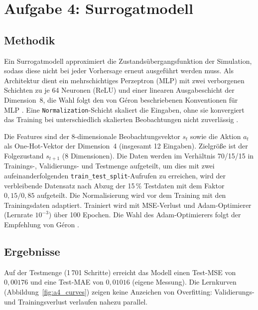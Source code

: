 
\section{Aufgabe 4: Surrogatmodell}
\label{sec:aufgabe4}

\subsection{Methodik}

Ein Surrogatmodell approximiert die Zustandsübergangsfunktion der Simulation, sodass diese nicht bei jeder Vorhersage erneut ausgeführt werden muss. Als Architektur dient ein mehrschichtiges Perzeptron (\ac{MLP}) mit zwei verborgenen Schichten zu je 64 Neuronen (\ac{ReLU}) und einer linearen Ausgabeschicht der Dimension~8, die Wahl folgt den von Géron beschriebenen Konventionen für \ac{MLP} \cite[S.~443--446]{1}. Eine \texttt{Normalization}-Schicht skaliert die Eingaben, ohne sie konvergiert das Training bei unterschiedlich skalierten Beobachtungen nicht zuverlässig \cite[S.~51--53]{2}.

Die Features sind der 8-dimensionale Beobachtungsvektor $s_t$ sowie die Aktion $a_t$ als One-Hot-Vektor der Dimension~4 (insgesamt 12 Eingaben). Zielgröße ist der Folgezustand $s_{t+1}$ (8 Dimensionen). Die Daten werden im Verhältnis 70/15/15 in Trainings-, Validierungs- und Testmenge aufgeteilt, um dies mit zwei aufeinanderfolgenden \texttt{train\_test\_split}-Aufrufen zu erreichen, wird der verbleibende Datensatz nach Abzug der 15\,\% Testdaten mit dem Faktor $0{,}15/0{,}85$ aufgeteilt. Die Normalisierung wird vor dem Training mit den Trainingsdaten adaptiert. Trainiert wird mit \ac{MSE}-Verlust und \ac{Adam}-Optimierer (Lernrate $10^{-3}$) über 100 Epochen. Die Wahl des \ac{Adam}-Optimierers folgt der Empfehlung von Géron \cite[S.~542]{1}.

\subsection{Ergebnisse}

Auf der Testmenge (1\,701 Schritte) erreicht das Modell einen Test-\ac{MSE} von $0{,}00176$ und eine Test-\ac{MAE} von $0{,}01016$ (eigene Messung). Die Lernkurven (Abbildung~\ref{fig:a4_curves}) zeigen keine Anzeichen von Overfitting: Validierungs- und Trainingsverlust verlaufen nahezu parallel.

